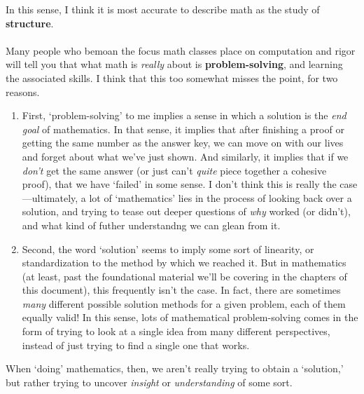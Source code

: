 \documentclass[10pt]{article}
\theoremstyle{definition}
\begin{document}
In this sense, I think it is most accurate to describe math as the
study of \textbf{structure}.  \\~\\
Many people who bemoan the focus math classes place on computation and
rigor will tell you that what math is \emph{really} about is
\textbf{problem-solving}, and learning the associated skills.  I think
that this too somewhat misses the point, for two reasons.
\begin{enumerate}
\item First, `problem-solving' to me implies a sense in which a
  solution is the \emph{end goal} of mathematics.  In that sense, it
  implies that after finishing a proof or getting the same number as
  the answer key, we can move on with our lives and forget about what
  we've just shown.  And similarly, it implies that if we \emph{don't}
  get the same answer (or just can't \emph{quite} piece together a
  cohesive proof), that we have `failed' in some sense.  I don't think
  this is really the case---ultimately, a lot of `mathematics' lies in
  the process of looking back over a solution, and trying to tease out
  deeper questions of \emph{why} worked (or didn't), and what kind of
  futher understandng we can glean from it.
\item Second, the word `solution' seems to imply some sort of
  linearity, or standardization to the method by which we reached it.
  But in mathematics (at least, past the foundational material we'll
  be covering in the chapters of this document), this frequently isn't
  the case.  In fact, there are sometimes \emph{many} different
  possible solution methods for a given problem, each of them equally
  valid!  In this sense, lots of mathematical problem-solving comes in
  the form of trying to look at a single idea from many different
  perspectives, instead of just trying to find a single one that
  works.
\end{enumerate}
When `doing' mathematics, then, we aren't really trying to obtain a
`solution,' but rather trying to uncover \emph{insight} or
\emph{understanding} of some sort.
\end{document}
